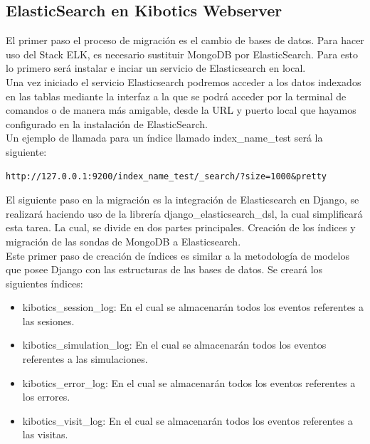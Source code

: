 \documentclass[11pt,a4paper]{book}
\begin{document}
			\subsection{ElasticSearch en Kibotics Webserver}
				El primer paso el proceso de migración es el cambio de bases de datos. Para hacer uso del Stack ELK, es necesario sustituir MongoDB por ElasticSearch. Para esto lo primero será instalar e inciar un servicio de Elasticsearch en local.\\
				
				Una vez iniciado el servicio Elasticsearch podremos acceder a los datos indexados en las tablas mediante la interfaz a la que se podrá acceder por la terminal de comandos o de manera más amigable, desde la URL y puerto local que hayamos configurado en la instalación de ElasticSearch.\\
				
				Un ejemplo de llamada para un índice llamado index\_name\_test será la siguiente:
				
				\begin{Verbatim}[tabsize=4]
http://127.0.0.1:9200/index_name_test/_search/?size=1000&pretty
				\end{Verbatim}
				
				El siguiente paso en la migración es la integración de Elasticsearch en Django, se realizará haciendo uso de la librería django\_elasticsearch\_dsl, la cual simplificará esta tarea. La cual, se divide en dos partes principales. Creación de los índices y migración de las sondas de MongoDB a Elasticsearch.\\
				
				
				Este primer paso de creación de índices es similar a la metodología de modelos que posee Django con las estructuras de las bases de datos. Se creará los siguientes índices: 				

				\begin{itemize}
					\item kibotics\_session\_log: En el cual se almacenarán todos los eventos referentes a las sesiones.
					
					\item kibotics\_simulation\_log: En el cual se almacenarán todos los eventos referentes a las simulaciones.
					
					\item kibotics\_error\_log: En el cual se almacenarán todos los eventos referentes a los errores.
					
					\item kibotics\_visit\_log: En el cual se almacenarán todos los eventos referentes a las visitas.
				\end{itemize}				
								
\end{document}

